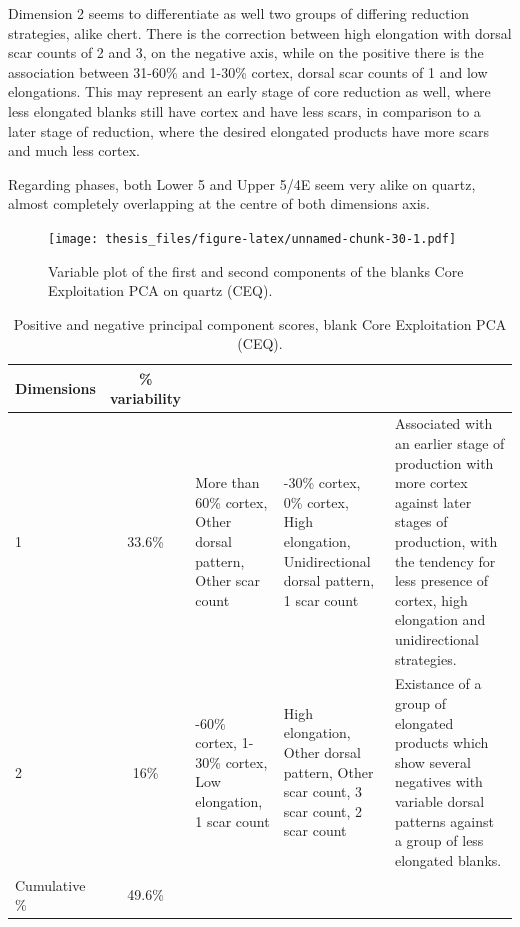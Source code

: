 \documentclass[12pt,twoside]{reedthesis}
\begin{document}
Dimension 2 seems to differentiate as well two groups of differing reduction strategies, alike chert. There is the correction between high elongation with dorsal scar counts of 2 and 3, on the negative axis, while on the positive there is the association between 31-60\% and 1-30\% cortex, dorsal scar counts of 1 and low elongations. This may represent an early stage of core reduction as well, where less elongated blanks still have cortex and have less scars, in comparison to a later stage of reduction, where the desired elongated products have more scars and much less cortex.

Regarding phases, both Lower 5 and Upper 5/4E seem very alike on quartz, almost completely overlapping at the centre of both dimensions axis.
\begin{figure}
\centering
\texttt{[image: thesis\_files/figure-latex/unnamed-chunk-30-1.pdf]}
\caption{\label{fig:unnamed-chunk-30}Variable plot of the first and second components of the blanks Core Exploitation PCA on quartz (CEQ).}
\end{figure}
\begin{table}[!h]

\caption{\label{tab:unnamed-chunk-31}Positive and negative principal component scores, blank Core Exploitation PCA (CEQ).}
\centering
\begin{tabular}[t]{lc>{\raggedright\arraybackslash}p{3cm}>{\raggedright\arraybackslash}p{3cm}>{\raggedright\arraybackslash}p{3cm}}
\toprule
\multicolumn{1}{c}{\textbf{Dimensions}} & \multicolumn{1}{c}{\textbf{\% variability}} & \multicolumn{1}{>{\centering\arraybackslash}p{3cm}}{\textbf{+}} & \multicolumn{1}{>{\centering\arraybackslash}p{3cm}}{\textbf{-}} & \multicolumn{1}{>{\centering\arraybackslash}p{3cm}}{\textbf{Interpretation}}\\
\midrule
1 & 33.6\% & More than 60\% cortex, Other dorsal pattern, Other scar count & 1-30\% cortex, 0\% cortex, High elongation, Unidirectional dorsal pattern, 1 scar count & Associated with an earlier stage of production with more cortex against later stages of production, with the
                               tendency for less presence of cortex, high elongation and unidirectional strategies.\\
2 & 16\% & 31-60\% cortex, 1-30\% cortex, Low elongation, 1 scar count & High elongation, Other dorsal pattern, Other scar count, 3 scar count, 2 scar count & Existance of a group of elongated products which show several negatives with variable dorsal patterns 
                               against a group of less elongated blanks.\\
Cumulative \% & 49.6\% &  &  & \\
\bottomrule
\end{tabular}
\end{table}
\end{document}
